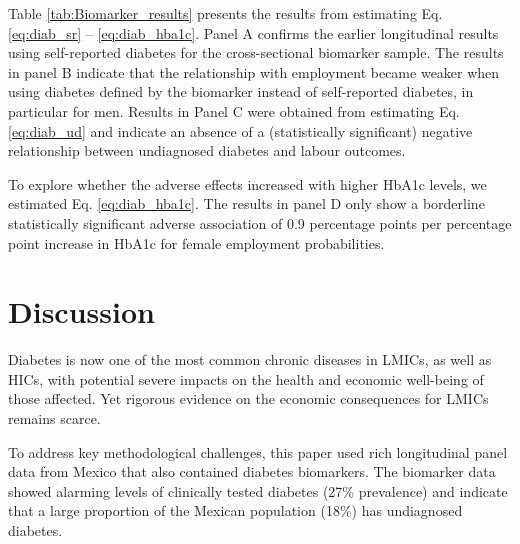 \documentclass[12pt,english]{article}
\begin{document}
Table \ref{tab:Biomarker_results} presents the results from estimating Eq. \ref{eq:diab_sr} -- \ref{eq:diab_hba1c}. Panel A confirms the earlier longitudinal results using self-reported diabetes for the cross-sectional biomarker sample. The results in panel B indicate that the relationship with employment became weaker when using diabetes defined by the biomarker instead of self-reported diabetes, in particular for men. Results in Panel C were obtained from estimating Eq. \ref{eq:diab_ud} and indicate an absence of a (statistically significant) negative relationship between undiagnosed diabetes and labour outcomes. 

To explore whether the adverse effects increased with higher \ac{HbA1c} levels, we estimated Eq. \ref{eq:diab_hba1c}. The results in panel D only show a borderline statistically significant adverse association of 0.9 percentage points per percentage point increase in \ac{HbA1c} for female employment probabilities.


\FloatBarrier

\section{\label{sec:cha_4_conclusion}Discussion}

Diabetes is now one of the most common chronic diseases in \acp{LMIC}, as well as \acp{HIC}, with potential severe impacts on the health and economic well-being of those affected.  Yet rigorous evidence on the economic consequences for \acp{LMIC} remains scarce.

To address key methodological challenges, this paper used rich longitudinal panel data from Mexico that also contained diabetes biomarkers. The biomarker data showed alarming levels of clinically tested diabetes (27\% prevalence) and indicate that a large proportion of the Mexican population (18\%) has undiagnosed diabetes.
\end{document}
